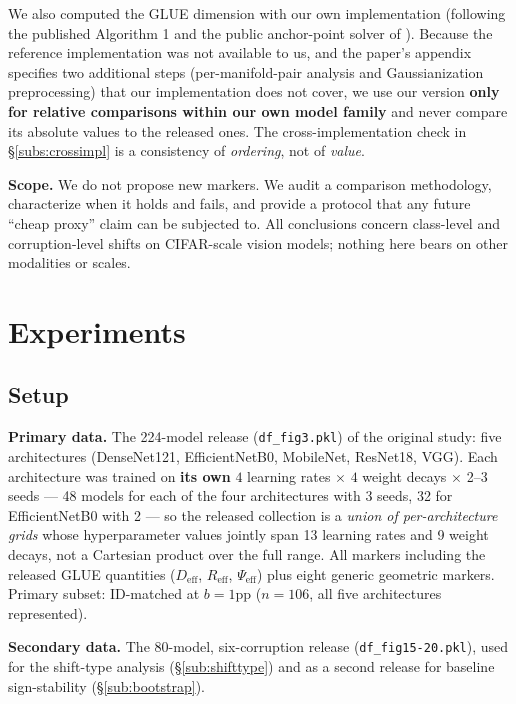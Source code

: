 \documentclass[10pt]{article} %
\newcommand{\srcref}[1]{\S\ref{#1}}
\begin{document}
We also computed the GLUE dimension with our own implementation (following the published Algorithm 1 and the public anchor-point solver of \citet{chung2018classification}). Because the reference implementation was not available to us, and the paper's appendix specifies two additional steps (per-manifold-pair analysis and Gaussianization preprocessing) that our implementation does not cover, we use our version \textbf{only for relative comparisons within our own model family} and never compare its absolute values to the released ones. The cross-implementation check in \srcref{subs:crossimpl} is a consistency of \emph{ordering}, not of \emph{value}.

\textbf{Scope.} We do not propose new markers. We audit a comparison methodology, characterize when it holds and fails, and provide a protocol that any future ``cheap proxy'' claim can be subjected to. All conclusions concern class-level and corruption-level shifts on CIFAR-scale vision models; nothing here bears on other modalities or scales.

\section{Experiments}
\label{sec:experiments}

\subsection{Setup}
\label{sub:setup}

\textbf{Primary data.} The 224-model release (\texttt{df\_fig3.pkl}) of the original study: five architectures (DenseNet121, EfficientNetB0, MobileNet, ResNet18, VGG). Each architecture was trained on \textbf{its own} $4$ learning rates $\times$ $4$ weight decays $\times$ 2--3 seeds --- 48 models for each of the four architectures with 3 seeds, 32 for EfficientNetB0 with 2 --- so the released collection is a \emph{union of per-architecture grids} whose hyperparameter values jointly span 13 learning rates and 9 weight decays, not a Cartesian product over the full range. All markers including the released GLUE quantities ($D_{\mathrm{eff}}$, $R_{\mathrm{eff}}$, $\Psi_{\mathrm{eff}}$) plus eight generic geometric markers. Primary subset: ID-matched at $b=1$pp ($n=106$, all five architectures represented).

\textbf{Secondary data.} The 80-model, six-corruption release (\texttt{df\_fig15-20.pkl}), used for the shift-type analysis (\srcref{sub:shifttype}) and as a second release for baseline sign-stability (\srcref{sub:bootstrap}).
\end{document}
